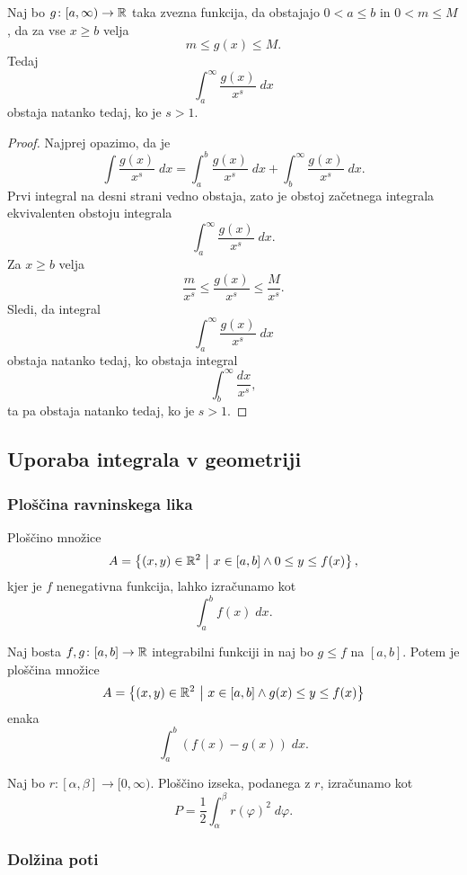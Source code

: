 \documentclass[12pt, a4paper]{article}
\begin{document}
\begin{trditev}
Naj bo $g\colon[a,\infty)\to\mathbb{R}$ taka zvezna funkcija, da obstajajo $0<a\leq b$ in $0<m\leq M$, da za vse $x\geq b$ velja
\[
m\leq g(x)\leq M.
\]
Tedaj
\[
\int_a^\infty \frac{g(x)}{x^s}\;dx
\]
obstaja natanko tedaj, ko je $s>1$.
\end{trditev}

\begin{proof}
Najprej opazimo, da je
\[
\int\frac{g(x)}{x^s}\;dx=\int_a^b\frac{g(x)}{x^s}\;dx+\int_b^\infty\frac{g(x)}{x^s}\;dx.
\]
Prvi integral na desni strani vedno obstaja, zato je obstoj začetnega integrala ekvivalenten obstoju integrala
\[
\int_a^\infty\frac{g(x)}{x^s}\;dx.
\]
Za $x\geq b$ velja
\[
\frac{m}{x^s}\leq\frac{g(x)}{x^s}\leq \frac{M}{x^s}.
\]
Sledi, da integral
\[
\int_a^\infty\frac{g(x)}{x^s}\;dx
\]
obstaja natanko tedaj, ko obstaja integral
\[
\int_b^\infty\frac{dx}{x^s},
\]
ta pa obstaja natanko tedaj, ko je $s>1$.
\end{proof}

\newpage

\subsection{Uporaba integrala v geometriji}

\subsubsection{Ploščina ravninskega lika}

Ploščino množice
\[
A=\left\{(x,y)\in\mathbb{R}^2~\middle\vert~x\in[a,b]\land 0\leq y\leq f(x)\right\},
\]
kjer je $f$ nenegativna funkcija, lahko izračunamo kot
\[
\int_a^b f(x)\;dx.
\]

\begin{trditev}
Naj bosta $f,g\colon[a,b]\to\mathbb{R}$ integrabilni funkciji in naj bo $g\leq f$ na $[a,b]$. Potem je ploščina množice
\[
A=\left\{(x,y)\in\mathbb{R}^2~\middle\vert~x\in[a,b]\land g(x)\leq y\leq f(x)\right\}
\]
enaka
\[
\int_a^b\left(f(x)-g(x)\right)\;dx.
\]
\end{trditev}

\begin{trditev}
Naj bo $r\colon[\alpha,\beta]\to[0,\infty)$. Ploščino izseka, podanega z $r$, izračunamo kot
\[
P=\frac{1}{2}\int_\alpha^\beta r(\varphi)^2\;d\varphi.
\]
\end{trditev}

\subsubsection{Dolžina poti}
\end{document}
